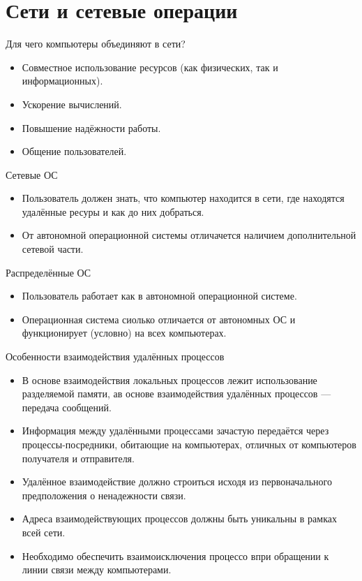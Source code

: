 \documentclass[12pt, a4paper]{article}
\begin{document}
    \section{Сети и сетевые операции}
    \begin{center}
        Для чего компьютеры объединяют в сети?
    \end{center}
    \begin{itemize}
        \item Совместное использование ресурсов (как физических, так и информационных).
        \item Ускорение вычислений.
        \item Повышение надёжности работы.
        \item Общение пользователей.
    \end{itemize}
    \begin{center}
        Сетевые ОС
    \end{center}
    \begin{itemize}
        \item Пользователь должен знать, что компьютер находится в сети, где находятся удалённые ресуры и как до них добраться.
        \item От автономной операционной системы отличачется наличием дополнительной сетевой части.
    \end{itemize}
    \begin{center}
        Распределённые ОС
    \end{center}
    \begin{itemize}
        \item Пользователь работает как в автономной операционной системе.
        \item Операционная система сиолько отличается от автономных ОС и функционирует (условно) на всех компьютерах.
    \end{itemize}
    \begin{center}
        Особенности взаимодействия удалённых процессов
    \end{center}
    \begin{itemize}
        \item В основе взаимодействия локальных процессов лежит использование разделяемой памяти, ав основе взаимодействия удалённых процессов --- передача сообщений.
        \item Информация между удалёнными процессами зачастую передаётся через процессы-посредники, обитающие на компьютерах, отличных от компьютеров получателя и отправителя.
        \item Удалённое взаимодействие должно строиться исходя из первоначального предположения о ненадежности связи.
        \item Адреса взаимодействующих процессов должны быть уникальны в рамках всей сети.
        \item Необходимо обеспечить взаимоисключения процессо впри обращении к линии связи между компьютерами.
    \end{itemize}
\end{document}
